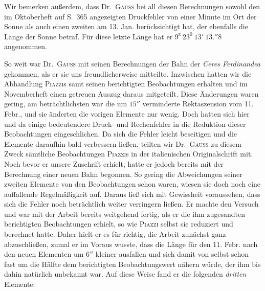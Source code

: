 Wir bemerken außerdem, dass Dr.\ \textsc{Gauss} bei all diesen Berechnungen sowohl den im Oktoberheft auf S.\ 365 angezeigten Druckfehler von einer Minute im Ort der Sonne als auch einen zweiten am 13. Jan. berücksichtigt hat, der ebenfalls die Länge der Sonne betraf. Für diese letzte Länge hat er $9^{\mathrm z}\ 23^0\ 13'\ 13.''8$ angenommen.

So weit war Dr.\ \textsc{Gauss} mit seinen Berechnungen der Bahn der \textit{Ceres Ferdinandea} gekommen, als er sie uns freundlicherweise mitteilte. Inzwischen hatten wir die Abhandlung \textsc{Piazzi}s samt seinen berichtigten Beobachtungen erhalten und im Novemberheft einen getreuen Auszug daraus mitgeteilt. Diese Änderungen waren gering, am beträchtlichsten war die um $15''$ verminderte Rektaszension vom 11. Febr., und sie änderten die vorigen Elemente nur wenig. Doch hatten sich hier und da einige bedeutendere Druck- und Rechenfehler in die Reduktion dieser Beobachtungen eingeschlichen. Da sich die Fehler leicht beseitigen und die Elemente daraufhin bald verbessern ließen, teilten wir Dr.\ \textsc{Gauss} zu diesem Zweck sämtliche Beobachtungen \textsc{Piazzi}s in der italienischen Originalschrift mit. Noch bevor er unsere Zuschrift erhielt, hatte er jedoch bereits mit der Berechnung einer neuen Bahn begonnen. So gering die Abweichungen seiner zweiten Elemente von den Beobachtungen schon waren, wiesen sie doch noch eine auffallende Regelmäßigkeit auf. Daraus ließ sich mit Gewissheit voraussehen, dass sich die Fehler noch beträchtlich weiter verringern ließen. Er machte den Versuch und war mit der Arbeit bereits weitgehend fertig, als er die ihm zugesandten berichtigten Beobachtungen erhielt, so wie \textsc{Piazzi} selbst sie reduziert und berechnet hatte. Daher hielt er es für richtig, die Arbeit zunächst ganz abzuschließen, zumal er im Voraus wusste, dass die Länge für den 11. Febr. nach den neuen Elementen um $6''$ kleiner ausfallen und sich damit von selbst schon fast um die Hälfte dem berichtigten Beobachtungswert nähern würde, der ihm bis dahin natürlich unbekannt war. Auf diese Weise fand er die folgenden \textit{dritten} Elemente:
